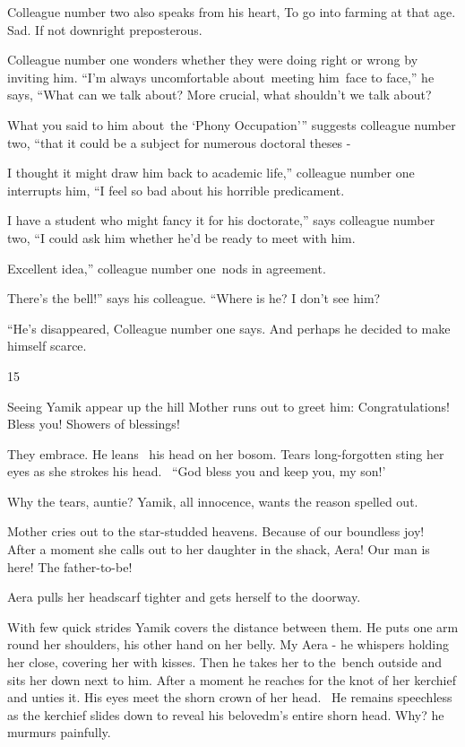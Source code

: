 \documentclass[12pt]{book}
\begin{document}
Colleague number two also speaks from his heart, {\textquotedbl}To go into farming at that age. Sad. If not downright
preposterous.{\textquotedbl}

Colleague number one wonders whether they were doing right or wrong by inviting him. ``I'm always uncomfortable
about~meeting him~face to face,'' he says, ``What can we talk about? More crucial, what shouldn't we talk
about?{\textquotedbl}

{\textquotedbl}What you said to him about~the `Phony Occupation'{}'' suggests colleague number two, ``that it could be a
subject for numerous doctoral theses -{\textquotedbl}

{\textquotedbl}I thought it might draw him back to academic life,'' colleague number one interrupts him, ``I feel so bad
about his horrible predicament.{\textquotedbl}

{\textquotedbl}I have a student who might fancy it for his doctorate,'' says colleague number two, ``I could ask him
whether he'd be ready to meet with him.{\textquotedbl}

{\textquotedbl}Excellent idea,'' colleague number one~nods in agreement.

{\textquotedbl}There's the bell!'' says his colleague. ``Where is he? I don't see him?{\textquotedbl}

{}``He's disappeared,{\textquotedbl} Colleague number one says. {\textquotedbl}And perhaps he decided to make himself
scarce.{\textquotedbl}


\bigskip

15~~

Seeing Yamik appear up the hill Mother runs out to greet him: {\textquotedbl}Congratulations! Bless you! Showers of
blessings!{\textquotedbl}

They embrace. He leans \ his head on her bosom. Tears long-forgotten sting her eyes as she strokes his head. \ {}``God
bless you and keep you, my son!'

{\textquotedbl}Why the tears, auntie?{\textquotedbl} Yamik, all innocence, wants the reason spelled out.

Mother cries out to the star-studded heavens. {\textquotedbl}Because of our boundless joy!{\textquotedbl}~ After a
moment she calls out to her daughter in the shack, {\textquotedbl}Aera! Our man is here! The
father-to-be!{\textquotedbl}

Aera pulls her headscarf tighter and gets herself to the doorway.

With few quick strides Yamik covers the distance between them. He puts one arm round her shoulders, his other hand on
her belly. {\textquotedbl}My Aera -{\textquotedbl} he whispers holding her close, covering her with kisses. Then he
takes her to the~bench outside and sits her down next to him. After a moment he reaches for the knot of her kerchief
and unties it. His eyes meet the shorn crown of her head. \ He remains speechless as the kerchief slides down to reveal
his belovedm's entire shorn head. {\textquotedbl}Why?{\textquotedbl} he murmurs painfully.
\end{document}
